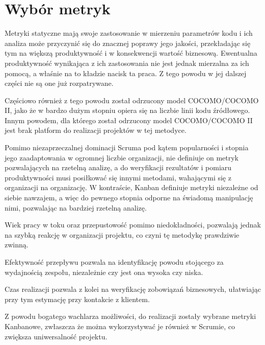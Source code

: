 \section{Wybór metryk}
Metryki statyczne mają swoje zastosowanie w mierzeniu parametrów kodu i ich analiza może przyczynić się do znacznej poprawy jego jakości, przekładając się tym
na większą produktywność i w konsekwencji wartość biznesową. Ewentualna produktywność wynikająca z ich zastosowania nie jest jednak mierzalna za ich pomocą, a właśnie
na to kładzie nacisk ta praca. Z tego powodu w jej dalszej części nie są one już rozpatrywane.

Częściowo również z tego powodu został odrzucony model COCOMO/COCOMO II, jako że w bardzo dużym stopniu opiera się na liczbie linii kodu źródłowego.
Innym powodem, dla którego został odrzucony model COCOMO/COCOMO II jest brak platform do realizacji projektów w tej metodyce.

Pomimo niezaprzeczalnej dominacji Scruma pod kątem popularności i stopnia jego zaadaptowania w ogromnej liczbie organizacji, nie definiuje on metryk pozwalających
na rzetelną analizę, a do weryfikacji rezultatów i pomiaru produktywności musi posiłkować się innymi metodami, wahającymi się z organizacji na organizację.
W kontraście, Kanban definiuje metryki niezależne od siebie nawzajem, a więc do pewnego stopnia odporne na świadomą manipulację nimi, pozwalając na bardziej rzetelną analizę.

Wiek pracy w toku oraz przepustowość pomimo niedokładności, pozwalają jednak na szybką reakcję w organizacji projektu, co czyni tę metodykę prawdziwie zwinną.

Efektywność przepływu pozwala na identyfikację powodu stojącego za wydajnością zespołu, niezależnie czy jest ona wysoka czy niska.

Czas realizacji pozwala z kolei na weryfikację zobowiązań biznesowych, ułatwiając przy tym estymację przy kontakcie z klientem.

Z powodu bogatego wachlarza możliwości, do realizacji zostały wybrane metryki Kanbanowe, zwłaszcza że można wykorzystywać je również w Scrumie, co zwiększa uniwersalność projektu.
